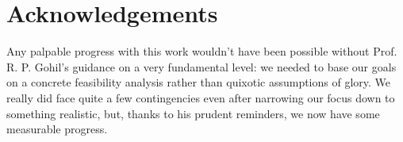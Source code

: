 \documentclass[12pt,a4paper,twoside,openright,bibliography=totocnumbered]{report}
\begin{document}





\chapter*{Acknowledgements}

Any palpable progress with this work wouldn't have been possible without Prof. R. P. Gohil's guidance on a very fundamental level: we needed to base our goals on a concrete feasibility analysis rather than quixotic assumptions of glory. We really did face quite a few contingencies even after narrowing our focus down to something realistic, but, thanks to his prudent reminders, we now have some measurable progress.
\end{document}
